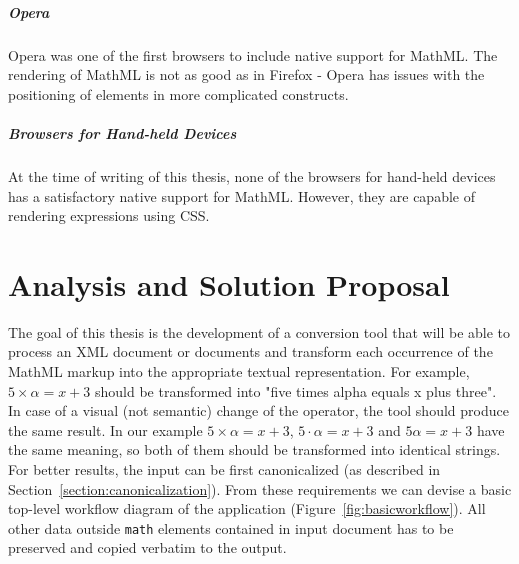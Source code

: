 \documentclass[11pt,oneside,final]{fithesis2}
\begin{document}
\paragraph*{Opera}
Opera was one of the first browsers to include native support for MathML. The rendering of MathML is not as good as in Firefox - Opera has issues with the positioning of elements in more complicated constructs. 

\paragraph*{Browsers for Hand-held Devices}
At the time of writing of this thesis, none of the browsers for hand-held devices has a satisfactory native support for MathML. However, they are capable of rendering expressions using CSS.


\chapter{Analysis and Solution Proposal}
The goal of this thesis is the development of a conversion tool that will be able to process an XML document or documents and transform each occurrence of the MathML markup into the appropriate textual representation. For example, $5 \times \alpha = x + 3$ should be transformed into "five times alpha equals x plus three". In case of a visual (not semantic) change of the operator, the tool should produce the same result. In our example $5 \times \alpha = x + 3$, $5 \cdot \alpha = x + 3$ and $5\alpha = x + 3$ have the same meaning, so both of them should be transformed into identical strings. For better results, the input can be first canonicalized (as described in Section~\ref{section:canonicalization}). From these requirements we can devise a basic top-level workflow diagram of the application (Figure~\ref{fig:basicworkflow}). All other data outside \texttt{math} elements contained in input document has to be preserved and copied verbatim to the output.
\end{document}
